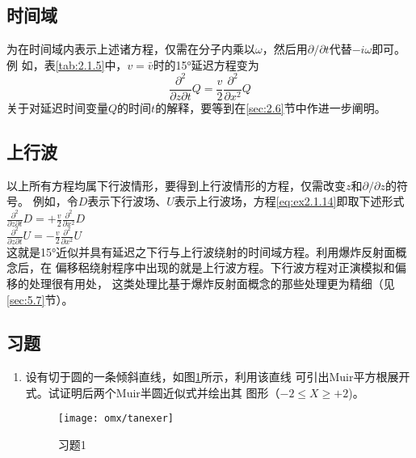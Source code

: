 \subsection{时间域}
\label{sec:2.1.8}

为在时间域内表示上述诸方程，仅需在分子内乘以$\omega$，然后用$\partial/\partial t$代替$-i\omega$即可。例
如，表\ref{tab:2.1.5}中，$v=\bar{v}$时的15°延迟方程变为
\begin{equation}
\frac{\partial^2}{\partial z\partial t}Q=\frac{v}{2}\frac{\partial^2}{\partial x^2}Q
\label{eq:ex2.1.14}
\end{equation}
关于对延迟时间变量$Q$的时间$t$的解释，要等到在\ref{sec:2.6}节中作进一步阐明。

\subsection{上行波}
\label{sec:2.1.9}

以上所有方程均属下行波情形，要得到上行波情形的方程，仅需改变$z$和$\partial/\partial z$的符号。
例如，令$D$表示下行波场、$U$表示上行波场，方程\ref{eq:ex2.1.14}即取下述形式\\
$\frac{\partial^2}{\partial z\partial t}D=+\frac{v}{2}\frac{\partial^2}{\partial x^2}D$\\
$\frac{\partial^2}{\partial z\partial t}U=-\frac{v}{2}\frac{\partial^2}{\partial x^2}U$\\
这就是15°近似并具有延迟之下行与上行波绕射的时间域方程。利用爆炸反射面概念后，在
偏移稆绕射程序中出现的就是上行波方程。下行波方程对正演模拟和偏移的处理很有用处，
这类处理比基于爆炸反射面概念的那些处理更为精细（见\ref{sec:5.7}节）。

\subsection{习题}
\label{sec:2.1.10}

\begin{enumerate}
\item 设有切于圆的一条倾斜直线，如图\ref{fig:omx/tanexer}所示，利用该直线
可引出Muir平方根展开式。试证明后两个Muir半圆近似式并绘出其
图形（$-2\leq X\geq +2$)。
\begin{figure}[H]
\centering
\texttt{[image: omx/tanexer]}
\caption{习题1}
\label{fig:omx/tanexer}
\end{figure}
\end{enumerate}
